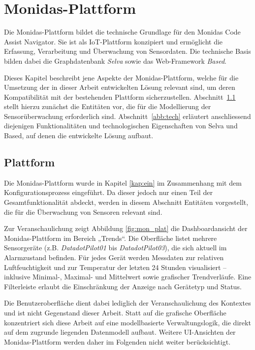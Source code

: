 \section{Monidas-Plattform}
\label{mon}

Die Monidas-Plattform bildet die technische Grundlage für den Monidas Code Assist Navigator. Sie ist als IoT-Plattform konzipiert und ermöglicht die Erfassung, Verarbeitung und Überwachung von Sensordaten. Die technische Basis bilden dabei die Graphdatenbank \textit{Selva} sowie das Web-Framework \textit{Based}.

Dieses Kapitel beschreibt jene Aspekte der Monidas-Plattform, welche für die Umsetzung der in dieser Arbeit entwickelten Lösung relevant sind, um deren Kompatibilität mit der bestehenden Plattform sicherzustellen. Abschnitt~\ref{mon:plat} stellt hierzu zunächst die Entitäten vor, die für die Modellierung der Sensorüberwachung erforderlich sind. Abschnitt~\ref{abb:tech} erläutert anschliessend diejenigen Funktionalitäten und technologischen Eigenschaften von Selva und Based, auf denen die entwickelte Lösung aufbaut.

\subsection{Plattform}
\label{mon:plat}
Die Monidas-Plattform wurde in Kapitel \ref{kap:ein} im Zusammenhang mit dem Konfigurationsprozess eingeführt. Da dieser jedoch nur einen Teil der Gesamtfunktionalität abdeckt, werden in diesem Abschnitt Entitäten vorgestellt, die für die Überwachung von Sensoren relevant sind.

Zur Veranschaulichung zeigt Abbildung \ref{fig:mon_plat} die Dashboardansicht der Monidas-Plattform im Bereich „Trends“.  
Die Oberfläche listet mehrere Sensorgeräte (z.B. \textit{DatadotPilot01} bis \textit{DatadotPilot03}), die sich aktuell im Alarmzustand befinden. Für jedes Gerät werden Messdaten zur relativen Luftfeuchtigkeit und zur Temperatur der letzten 24 Stunden visualisiert – inklusive Minimal-, Maximal- und Mittelwert sowie grafischer Trendverläufe. Eine Filterleiste erlaubt die Einschränkung der Anzeige nach Gerätetyp und Status.

Die Benutzeroberfläche dient dabei lediglich der Veranschaulichung des Kontextes und ist nicht Gegenstand dieser Arbeit.  
Statt auf die grafische Oberfläche konzentriert sich diese Arbeit auf eine modellbasierte Verwaltungslogik, die direkt auf dem zugrunde liegenden Datenmodell aufbaut.  
Weitere UI-Ansichten der Monidas-Plattform werden daher im Folgenden nicht weiter berücksichtigt.

